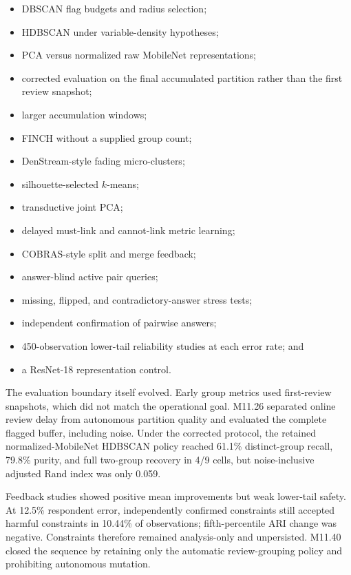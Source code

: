 \documentclass[12pt,oneside]{report}
\begin{document}
\begin{itemize}
\item DBSCAN flag budgets and radius selection;
\item HDBSCAN under variable-density hypotheses;
\item PCA versus normalized raw MobileNet representations;
\item corrected evaluation on the final accumulated partition rather than the
first review snapshot;
\item larger accumulation windows;
\item FINCH without a supplied group count;
\item DenStream-style fading micro-clusters;
\item silhouette-selected $k$-means;
\item transductive joint PCA;
\item delayed must-link and cannot-link metric learning;
\item COBRAS-style split and merge feedback;
\item answer-blind active pair queries;
\item missing, flipped, and contradictory-answer stress tests;
\item independent confirmation of pairwise answers;
\item 450-observation lower-tail reliability studies at each error rate; and
\item a ResNet-18 representation control.
\end{itemize}

The evaluation boundary itself evolved. Early group metrics used first-review
snapshots, which did not match the operational goal. M11.26 separated online
review delay from autonomous partition quality and evaluated the complete
flagged buffer, including noise. Under the corrected protocol, the retained
normalized-MobileNet HDBSCAN policy reached 61.1\% distinct-group recall,
79.8\% purity, and full two-group recovery in 4/9 cells, but noise-inclusive
adjusted Rand index was only 0.059.

Feedback studies showed positive mean improvements but weak lower-tail safety.
At 12.5\% respondent error, independently confirmed constraints still accepted
harmful constraints in 10.44\% of observations; fifth-percentile ARI change was
negative. Constraints therefore remained analysis-only and unpersisted.
M11.40 closed the sequence by retaining only the automatic review-grouping
policy and prohibiting autonomous mutation.
\end{document}
